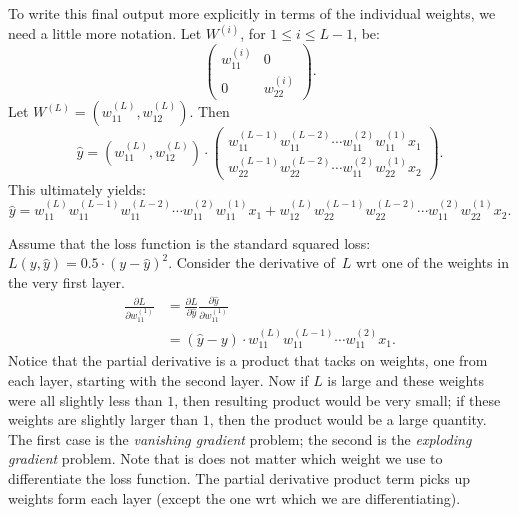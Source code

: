 To write this final output more explicitly in terms of the individual weights, 
we need a little more notation. Let $W^{(i)}$, for $1 \leq i \leq L - 1$, be:
\[
    \left ( 
        \begin{array}{cc}
            w_{11}^{(i)} & 0            \\
            0            & w_{22}^{(i)}
        \end{array}
    \right ).
\]
Let $W^{(L)} = (w_{11}^{(L)}, w_{12}^{(L)})$. Then 
\[
    \hat{y} = (w_{11}^{(L)}, w_{12}^{(L)}) \cdot 
             \left ( 
                \begin{array}{cc}
                    w_{11}^{(L - 1)} w_{11}^{(L - 2)} \cdots w_{11}^{(2)} w_{11}^{(1)} x_1 \\
                    w_{22}^{(L - 1)} w_{22}^{(L - 2)} \cdots w_{11}^{(2)} w_{22}^{(1)} x_2
                \end{array}
            \right ).
\]
This ultimately yields:
\[
    \hat{y} =  w_{11}^{(L)} w_{11}^{(L - 1)} w_{11}^{(L - 2)} \cdots w_{11}^{(2)} w_{11}^{(1)} x_1 
               + w_{12}^{(L)} w_{22}^{(L - 1)} w_{22}^{(L - 2)} \cdots w_{11}^{(2)} w_{22}^{(1)} x_2.
\]

Assume that the loss function is the standard squared loss: $L(y, \hat{y}) = 0.5 \cdot (y - \hat{y})^2$. 
Consider the derivative of~$L$ wrt one of the weights in the very first layer. 
\begin{align*}
    \frac{\partial L}{\partial w_{11}^{(1)}} & = 
        \frac{\partial L}{\partial \hat{y}}
        \frac{\partial \hat{y}}{\partial w_{11}^{(1)}} \\
        & = (\hat{y} - y) \cdot w_{11}^{(L)} w_{11}^{(L - 1)} \cdots w_{11}^{(2)} x_1. 
\end{align*}
Notice that the partial derivative is a product that tacks on weights, one from each 
layer, starting with the second layer. Now if $L$ is large and these weights were 
all slightly less than $1$, then resulting product would be very small; if these weights 
are slightly larger than $1$, then the product would be a large quantity. The first 
case is the \emph{vanishing gradient} problem; the second is the 
\emph{exploding gradient} problem. Note that is does not matter which 
weight we use to differentiate the loss function. The partial derivative product 
term picks up weights form each layer (except the one wrt which we are differentiating). 
 
